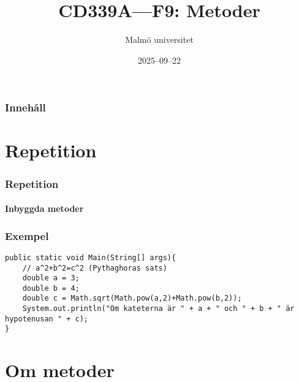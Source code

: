 \documentclass[aspectratio=169]{beamer}
\title{CD339A---F9: Metoder}
\author{Malmö universitet}
\date{2025--09--22}
\institute{Institutionen för datavetenskap och medieteknik}
\begin{document}
\begin{frame}
    \frametitle{Innehåll}


\end{frame}

\section{Repetition}

\begin{frame}
    \frametitle{Repetition}
    \framesubtitle{Inbyggda metoder}



\end{frame}

\begin{frame}[fragile]
    \frametitle{Exempel}


    \begin{lstlisting}
public static void Main(String[] args){
    // a^2+b^2=c^2 (Pythaghoras sats)
    double a = 3;
    double b = 4;
    double c = Math.sqrt(Math.pow(a,2)+Math.pow(b,2));
    System.out.println("Om kateterna är " + a + " och " + b + " är hypotenusan " + c);
}   \end{lstlisting}


\end{frame}

\section{Om metoder}
\end{document}
